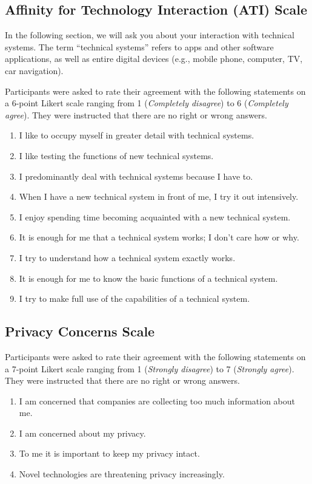 \subsection*{Affinity for Technology Interaction (ATI) Scale}
In the following section, we will ask you about your interaction with technical systems. The term ``technical systems'' refers to apps and other software applications, as well as entire digital devices (e.g., mobile phone, computer, TV, car navigation).

Participants were asked to rate their agreement with the following statements on a 6-point Likert scale ranging from 1 (\textit{Completely disagree}) to 6 (\textit{Completely agree}). They were instructed that there are no right or wrong answers.

\begin{enumerate}
    \item I like to occupy myself in greater detail with technical systems.
    \item I like testing the functions of new technical systems.
    \item I predominantly deal with technical systems because I have to.
    \item When I have a new technical system in front of me, I try it out intensively.
    \item I enjoy spending time becoming acquainted with a new technical system.
    \item It is enough for me that a technical system works; I don't care how or why.
    \item I try to understand how a technical system exactly works.
    \item It is enough for me to know the basic functions of a technical system.
    \item I try to make full use of the capabilities of a technical system.
\end{enumerate}

\subsection*{Privacy Concerns Scale}
Participants were asked to rate their agreement with the following statements on a 7-point Likert scale ranging from 1 (\textit{Strongly disagree}) to 7 (\textit{Strongly agree}). They were instructed that there are no right or wrong answers.

\begin{enumerate}
    \item I am concerned that companies are collecting too much information about me.
    \item I am concerned about my privacy.
    \item To me it is important to keep my privacy intact.
    \item Novel technologies are threatening privacy increasingly.
\end{enumerate}

